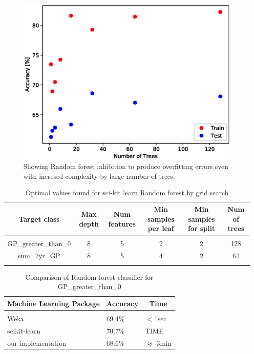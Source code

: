 \documentclass{article} %
\begin{document}
\begin{figure}[h]
\begin{center}
\includegraphics{n_trees}
\end{center}
\caption{Showing Random forest inhibition to produce overfitting errors even with incresed complexity by large number of trees.}
\end{figure}

\begin{table}[t]
\caption{Optimal values found for sci-kit learn Random forest by grid search}
\begin{center}
\begin{tabular}{cccccc}
{\bf Target class} &{\bf Max depth} &{\bf Num features} &{\bf Min samples per leaf} &{\bf Min samples for split} &{\bf Num of trees}
\\ \hline \\
GP\_greater\_than\_0         &8	&5	&2	&2	&128 \\
sum\_7yr\_GP         &8	&5	&4	&2	&64 \\
\label{scikit-table}
\end{tabular}
\end{center}
\end{table}


\begin{table}[t]
\caption{Comparison of Random forest classifier for GP\_greater\_than\_0}
\label{clas-table}
\begin{center}
\begin{tabular}{lll}
\multicolumn{1}{c}{\bf Machine Learning Package} &\multicolumn{1}{c}{\bf Accuracy} &\multicolumn{1}{c}{\bf Time}
\\ \hline \\
Weka         &69.4\%	&$<$1sec \\
scikit-learn             &70.7\%	&TIME \\
our implementation             &68.6\%	&$\approx$ 3min \\

\end{tabular}
\end{center}
\end{table}
\end{document}
